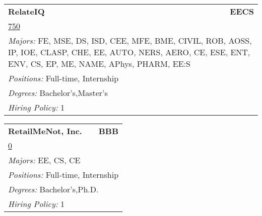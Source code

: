 \documentclass[twoside]{article}
\begin{document}
\begin{center}
\begin{multicols}{3}
\begin{FlushLeft}
\begin{minipage}{.9\columnwidth}
\end{minipage}
 
\begin{minipage}{.9\columnwidth}\begin{tabularx}{.95\columnwidth}{Xr}
                 {\Large\bf RelateIQ} & {\Large\bf EECS}\\
    \multicolumn{2}{p{.95\columnwidth}}{\url{750}}\\
    \multicolumn{2}{p{.95\columnwidth}}{\emph{Majors:} FE, MSE, DS, ISD, CEE, MFE, BME, CIVIL, ROB, AOSS, IP, IOE, CLASP, CHE, EE, AUTO, NERS, AERO, CE, ESE, ENT, ENV, CS, EP, ME, NAME, APhys, PHARM, EE:S}\\
    \multicolumn{2}{p{.95\columnwidth}}{\emph{Positions:} Full-time, Internship}\\
    \multicolumn{2}{p{.95\columnwidth}}{\emph{Degrees:} Bachelor's,Master's}\\
    \multicolumn{2}{p{.95\columnwidth}}{\emph{Hiring Policy:} 1}\\
    \end{tabularx}
    
\end{minipage}
 
\begin{minipage}{.9\columnwidth}\begin{tabularx}{.95\columnwidth}{Xr}
                 {\Large\bf RetailMeNot, Inc.} & {\Large\bf BBB}\\
    \multicolumn{2}{p{.95\columnwidth}}{\url{0}}\\
    \multicolumn{2}{p{.95\columnwidth}}{\emph{Majors:} EE, CS, CE}\\
    \multicolumn{2}{p{.95\columnwidth}}{\emph{Positions:} Full-time, Internship}\\
    \multicolumn{2}{p{.95\columnwidth}}{\emph{Degrees:} Bachelor's,Ph.D.}\\
    \multicolumn{2}{p{.95\columnwidth}}{\emph{Hiring Policy:} 1}\\
    \end{tabularx}
    
\end{minipage}
 

\end{FlushLeft}
\end{multicols}
\end{center}
\end{document}
